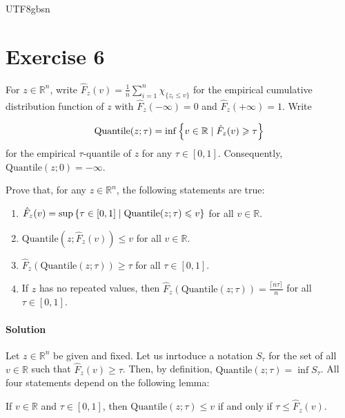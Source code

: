 \documentclass[../main.tex]{subfiles}
\begin{document}
\begin{CJK*}{UTF8}{gbsn}

\section*{Exercise 6}

For $z \in \mathbb{R}^n$,
write $\hat{F}_z(v) = \frac{1}{n} \sum_{i=1}^n \chi_{\{z_i \leq v\}}$ 
for the empirical cumulative distribution function of $z$
with $\hat{F}_z(-\infty) = 0$ and $\hat{F}_z(+\infty) = 1$.
Write 

\begin{equation*}
  \text{Quantile}(z; \tau) 
  = \inf \left \{ v \in \mathbb{R} \mid \hat{F}_z(v) \geqslant \tau \right \}
\end{equation*}
for the empirical $\tau$-quantile of $z$ for any $\tau \in [0, 1]$.
Consequently, $\text{Quantile}(z; 0) = -\infty$.

Prove that, for any $z \in \mathbb{R}^n$,
the following statements are true:

\begin{enumerate}
  \item $\hat{F}_z(v) = \sup 
  \left \{ \tau \in [0, 1] \mid \text{Quantile}(z; \tau) \leqslant v \right \}$ for all $v \in \mathbb{R}$.
  \item $\text{Quantile}(z; \hat{F}_z(v)) \leqslant v$ for all $v \in \mathbb{R}$.
  \item $\hat{F}_z(\text{Quantile}(z; \tau)) \geqslant \tau$ for all $\tau \in [0, 1]$.
  \item If $z$ has no repeated values, then 
  $\hat{F}_z(\text{Quantile}(z; \tau)) = \frac{\lceil n\tau \rceil}{n}$ for all $\tau \in [0, 1]$.
\end{enumerate}

\paragraph{Solution}
Let $z \in \mathbb{R}^n$ be given and fixed.
Let us inrtoduce a notation $S_{\tau}$
for the set of all $v \in \mathbb{R}$ such that $\hat{F}_z(v) \geqslant \tau$.
Then, by definition, $\text{Quantile}(z; \tau) = \inf S_{\tau}$.
All four statements depend on the following lemma:

\begin{lemma}
If $v \in \mathbb{R}$ and $\tau \in [0, 1]$, then
$\text{Quantile}(z; \tau) \leqslant v$ if and only if $\tau \leqslant \hat{F}_z(v)$.
\end{lemma}


\end{CJK*}
\end{document}
